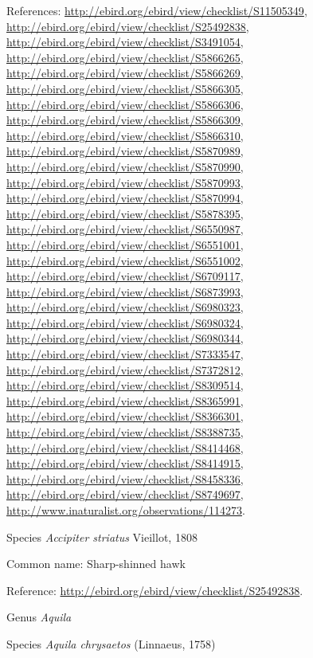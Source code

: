 \documentclass[9pt, article]{memoir}
\begin{document}
\begin{multicols}{2}
References: 
\url{http://ebird.org/ebird/view/checklist/S11505349}, 
\url{http://ebird.org/ebird/view/checklist/S25492838}, 
\url{http://ebird.org/ebird/view/checklist/S3491054}, 
\url{http://ebird.org/ebird/view/checklist/S5866265}, 
\url{http://ebird.org/ebird/view/checklist/S5866269}, 
\url{http://ebird.org/ebird/view/checklist/S5866305}, 
\url{http://ebird.org/ebird/view/checklist/S5866306}, 
\url{http://ebird.org/ebird/view/checklist/S5866309}, 
\url{http://ebird.org/ebird/view/checklist/S5866310}, 
\url{http://ebird.org/ebird/view/checklist/S5870989}, 
\url{http://ebird.org/ebird/view/checklist/S5870990}, 
\url{http://ebird.org/ebird/view/checklist/S5870993}, 
\url{http://ebird.org/ebird/view/checklist/S5870994}, 
\url{http://ebird.org/ebird/view/checklist/S5878395}, 
\url{http://ebird.org/ebird/view/checklist/S6550987}, 
\url{http://ebird.org/ebird/view/checklist/S6551001}, 
\url{http://ebird.org/ebird/view/checklist/S6551002}, 
\url{http://ebird.org/ebird/view/checklist/S6709117}, 
\url{http://ebird.org/ebird/view/checklist/S6873993}, 
\url{http://ebird.org/ebird/view/checklist/S6980323}, 
\url{http://ebird.org/ebird/view/checklist/S6980324}, 
\url{http://ebird.org/ebird/view/checklist/S6980344}, 
\url{http://ebird.org/ebird/view/checklist/S7333547}, 
\url{http://ebird.org/ebird/view/checklist/S7372812}, 
\url{http://ebird.org/ebird/view/checklist/S8309514}, 
\url{http://ebird.org/ebird/view/checklist/S8365991}, 
\url{http://ebird.org/ebird/view/checklist/S8366301}, 
\url{http://ebird.org/ebird/view/checklist/S8388735}, 
\url{http://ebird.org/ebird/view/checklist/S8414468}, 
\url{http://ebird.org/ebird/view/checklist/S8414915}, 
\url{http://ebird.org/ebird/view/checklist/S8458336}, 
\url{http://ebird.org/ebird/view/checklist/S8749697}, 
\url{http://www.inaturalist.org/observations/114273}.

\vspace{6pt}\noindent\hspace{36pt}Species \textit{Accipiter striatus} Vieillot, 1808


Common name: Sharp-shinned hawk

Reference: 
\url{http://ebird.org/ebird/view/checklist/S25492838}.

\vspace{6pt}\noindent\hspace{30pt}Genus \textit{Aquila}


\vspace{6pt}\noindent\hspace{36pt}Species \textit{Aquila chrysaetos} (Linnaeus, 1758)



\end{multicols}
\end{document}
